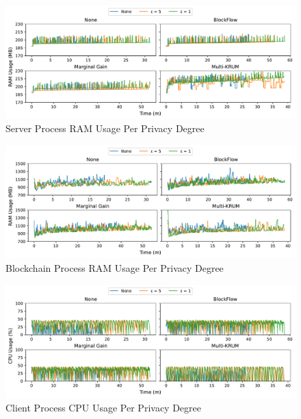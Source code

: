 \begin{figure}[!h]
    \centering
    \includegraphics[width=\textwidth]{graphics/privacy/ram_server.pdf}
    \caption{Server Process RAM Usage Per Privacy Degree}
    \label{fig:ram_privacy_servers}
\end{figure}

\begin{figure}[!h]
    \centering
    \includegraphics[width=\textwidth]{graphics/privacy/ram_miner.pdf}
    \caption{Blockchain Process RAM Usage Per Privacy Degree}
    \label{fig:ram_privacy_miners}
\end{figure}

\clearpage

\begin{figure}[!h]
    \centering
    \includegraphics[width=\textwidth]{graphics/privacy/cpu_client.pdf}
    \caption{Client Process CPU Usage Per Privacy Degree}
    \label{fig:cpu_privacy_clients}
\end{figure}

